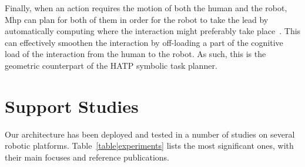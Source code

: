 \documentclass[preprint,3p,times]{elsarticle}
\begin{document}
Finally, when an action requires the motion of both the human and the robot,
{\sc Mhp} can plan for both of them in order for the robot to take
the lead by automatically computing where the interaction might
preferably take place~\cite{Mainprice2012,waldhart2015planning}.
This can effectively smoothen the interaction by off-loading a part of the
cognitive load of the interaction from the human to the robot.
As such, this is the geometric counterpart of the HATP symbolic task
planner.

%
%
%



\section{Support Studies}
\label{sec:expe}

Our architecture has been deployed and tested in a number of studies on
several robotic platforms. Table~\ref{table|experiments} lists the most
significant ones, with their main focuses and reference publications.
\end{document}
